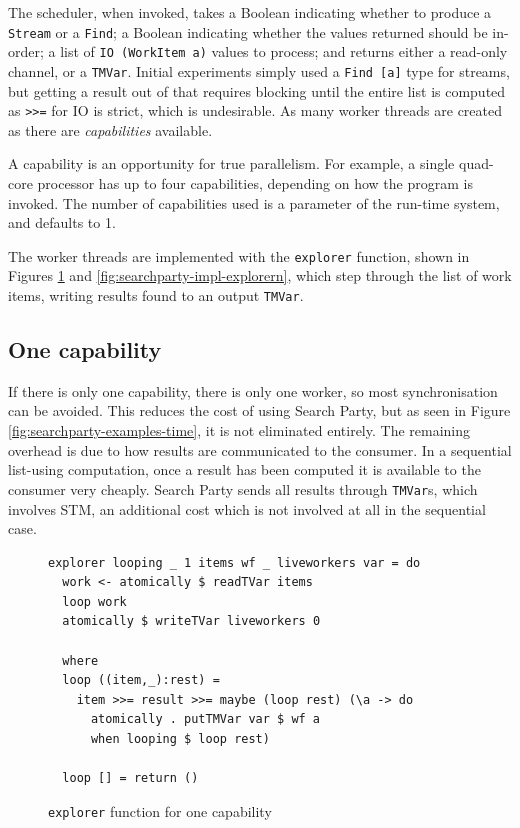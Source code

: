 The scheduler, when invoked, takes a Boolean indicating whether to
produce a \verb|Stream| or a \verb|Find|; a Boolean indicating whether
the values returned should be in-order; a list of
\verb|IO (WorkItem a)| values to process; and returns either a
read-only channel, or a \verb|TMVar|. Initial experiments simply used
a \verb|Find [a]| type for streams, but getting a result out of that
requires blocking until the entire list is computed as \verb|>>=| for
IO is strict, which is undesirable. As many worker threads are created
as there are \textit{capabilities} available.

A capability is an opportunity for true parallelism. For example, a
single quad-core processor has up to four capabilities, depending on
how the program is invoked. The number of capabilities used is a
parameter of the run-time system, and defaults to 1.

The worker threads are implemented with the \verb|explorer| function,
shown in Figures \ref{fig:searchparty-impl-explorer1} and
\ref{fig:searchparty-impl-explorern}, which step through the list of
work items, writing results found to an output \verb|TMVar|.

\subsection{One capability}
\label{sec:searchparty-impl-one}

If there is only one capability, there is only one worker, so most
synchronisation can be avoided. This reduces the cost of using Search
Party, but as seen in Figure \ref{fig:searchparty-examples-time}, it
is not eliminated entirely. The remaining overhead is due to how
results are communicated to the consumer. In a sequential list-using
computation, once a result has been computed it is available to the
consumer very cheaply. Search Party sends all results through
\verb|TMVar|s, which involves STM, an additional cost which is not
involved at all in the sequential case.

\begin{figure}[t]
  \centering
  \begin{verbatim}
explorer looping _ 1 items wf _ liveworkers var = do
  work <- atomically $ readTVar items
  loop work
  atomically $ writeTVar liveworkers 0

  where
  loop ((item,_):rest) =
    item >>= result >>= maybe (loop rest) (\a -> do
      atomically . putTMVar var $ wf a
      when looping $ loop rest)

  loop [] = return ()
  \end{verbatim}
  \caption{\texttt{explorer} function for one capability}
  \label{fig:searchparty-impl-explorer1}
\end{figure}

